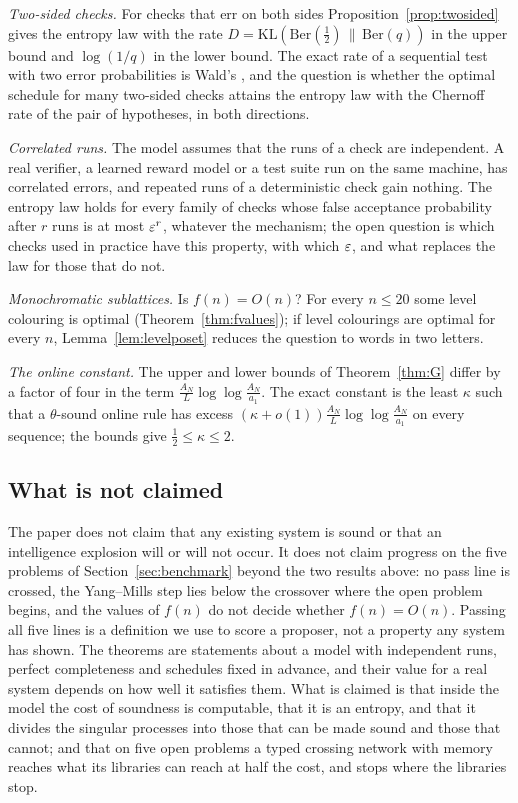\emph{Two-sided checks.} For checks that err on both sides Proposition~\ref{prop:twosided} gives the entropy law with the rate $D=\mathrm{KL}(\mathrm{Ber}(\frac12)\,\|\,\mathrm{Ber}(q))$ in the upper bound and $\log(1/q)$ in the lower bound. The exact rate of a sequential test with two error probabilities is Wald's \cite{Wal45}, and the question is whether the optimal schedule for many two-sided checks attains the entropy law with the Chernoff rate of the pair of hypotheses, in both directions.

\emph{Correlated runs.} The model assumes that the runs of a check are independent. A real verifier, a learned reward model or a test suite run on the same machine, has correlated errors, and repeated runs of a deterministic check gain nothing. The entropy law holds for every family of checks whose false acceptance probability after $r$ runs is at most $\varepsilon^{r}$, whatever the mechanism; the open question is which checks used in practice have this property, with which $\varepsilon$, and what replaces the law for those that do not.

\emph{Monochromatic sublattices.} Is $f(n)=O(n)$? For every $n\le20$ some level colouring is optimal (Theorem~\ref{thm:fvalues}); if level colourings are optimal for every $n$, Lemma~\ref{lem:levelposet} reduces the question to words in two letters.

\emph{The online constant.} The upper and lower bounds of Theorem~\ref{thm:G} differ by a factor of four in the term $\frac{A_{N}}{L}\log\log\frac{A_{N}}{a_{1}}$. The exact constant is the least $\kappa$ such that a $\theta$-sound online rule has excess $(\kappa+o(1))\frac{A_{N}}{L}\log\log\frac{A_{N}}{a_{1}}$ on every sequence; the bounds give $\frac12\le\kappa\le2$.

\subsection{What is not claimed}

The paper does not claim that any existing system is sound or that an intelligence explosion will or will not occur. It does not claim progress on the five problems of Section~\ref{sec:benchmark} beyond the two results above: no pass line is crossed, the Yang--Mills step lies below the crossover where the open problem begins, and the values of $f(n)$ do not decide whether $f(n)=O(n)$. Passing all five lines is a definition we use to score a proposer, not a property any system has shown. The theorems are statements about a model with independent runs, perfect completeness and schedules fixed in advance, and their value for a real system depends on how well it satisfies them. What is claimed is that inside the model the cost of soundness is computable, that it is an entropy, and that it divides the singular processes into those that can be made sound and those that cannot; and that on five open problems a typed crossing network with memory reaches what its libraries can reach at half the cost, and stops where the libraries stop.
